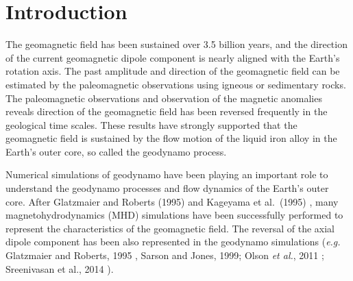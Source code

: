 \newpage
\section{Introduction}
\label{section:introduction}
The geomagnetic field has been sustained over 3.5 billion years, and the direction of the current geomagnetic dipole component is nearly aligned with the Earth's rotation axis. 
The past amplitude and direction of the geomagnetic field can be estimated by the paleomagnetic observations using igneous or sedimentary rocks. 
The paleomagnetic observations and observation of the magnetic anomalies reveals direction of the geomagnetic field has been reversed frequently in the geological time scales. 
These results have strongly supported that the geomagnetic field is sustained by the flow motion of the liquid iron alloy in the Earth's outer core, so called the geodynamo process. 

Numerical simulations {\color{red} of geodynamo} have 
{\color{red} been playing an important} role to understand the geodynamo processes and flow dynamics of the Earth's outer core.
After Glatzmaier and Roberts (1995) \cite{GR:1995} and Kageyama et al.\ (1995) \cite{Kageyama:1995}, many magnetohydrodynamics (MHD) simulations have been successfully performed to represent the characteristics of the geomagnetic field. 
The reversal of the axial dipole component has been also represented in the geodynamo simulations ({\it e.g.} Glatzmaier and Roberts, 1995 \cite{GR:1995}, Sarson and Jones, 1999\cite{Sarson:1999}; Olson {\it et al.}, 2011 \cite{Olson:2011}; Sreenivasan et al., 2014  \cite{Sreenivasan:2014}).

